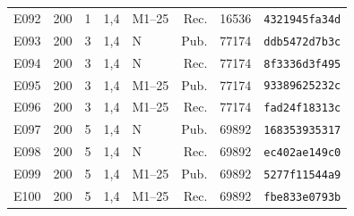 \begin{longtable}{lrrrlrrl}
E092 & 200 & 1 & 1,4 & M1--25 & Rec. & 16536 & \texttt{4321945fa34d} \\
E093 & 200 & 3 & 1,4 & N & Pub. & 77174 & \texttt{ddb5472d7b3c} \\
E094 & 200 & 3 & 1,4 & N & Rec. & 77174 & \texttt{8f3336d3f495} \\
E095 & 200 & 3 & 1,4 & M1--25 & Pub. & 77174 & \texttt{93389625232c} \\
E096 & 200 & 3 & 1,4 & M1--25 & Rec. & 77174 & \texttt{fad24f18313c} \\
E097 & 200 & 5 & 1,4 & N & Pub. & 69892 & \texttt{168353935317} \\
E098 & 200 & 5 & 1,4 & N & Rec. & 69892 & \texttt{ec402ae149c0} \\
E099 & 200 & 5 & 1,4 & M1--25 & Pub. & 69892 & \texttt{5277f11544a9} \\
E100 & 200 & 5 & 1,4 & M1--25 & Rec. & 69892 & \texttt{fbe833e0793b} \\
\end{longtable}

